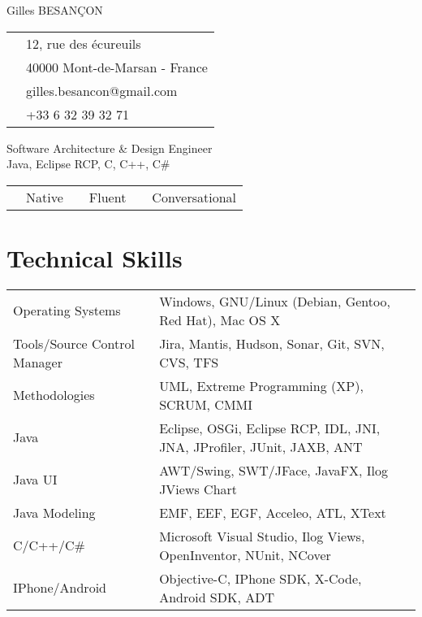 \documentclass[10pt,letterpaper]{resume/resume}
\begin{document}
  \begin{minipage}[t]{\linewidth * 1 / 3}
    {\Large Gilles BESAN\c{C}ON}\\
      \begin{tabular}{c l}
         \address{&12, rue des \'ecureuils\\}{&40000 Mont-de-Marsan - France}\\
         \email{&gilles.besancon@gmail.com}\\
         \phone{&+33 6 32 39 32 71}\\
      \end{tabular}
  \end{minipage}
  \begin{minipage}[t]{\linewidth * 2 / 3}
    \begin{center}
      {\huge{Software Architecture \& Design Engineer\\Java, Eclipse RCP, C, C++, C\#}}
      \begin{tabular}{c l c l c l}
      \french{FR:&Native}&\englishus{EN:&Fluent}&\spanish{SP:&Conversational}\\
      \end{tabular}
    \end{center}
  \end{minipage}
  
  \begin{minipage}[t]{\linewidth}
    \section{Technical Skills}
    \begin{tabular}{ll}
	Operating Systems&Windows, GNU/Linux (Debian, Gentoo, Red Hat), Mac OS X\\
	Tools/Source Control Manager&Jira, Mantis, Hudson, Sonar, Git, SVN, CVS, TFS\\
	Methodologies&UML, Extreme Programming (XP), SCRUM, CMMI\\
	Java&Eclipse, OSGi, Eclipse RCP, IDL, JNI, JNA, JProfiler, JUnit, JAXB, ANT\\
	Java UI&AWT/Swing, SWT/JFace, JavaFX, Ilog JViews Chart\\
	Java Modeling&EMF, EEF, EGF, Acceleo, ATL, XText\\
	C/C++/C\#&Microsoft Visual Studio, Ilog Views, OpenInventor, NUnit, NCover\\
	IPhone/Android&Objective-C, IPhone SDK, X-Code, Android SDK, ADT\\
    \end{tabular}
  \end{minipage}
  
\end{document}
